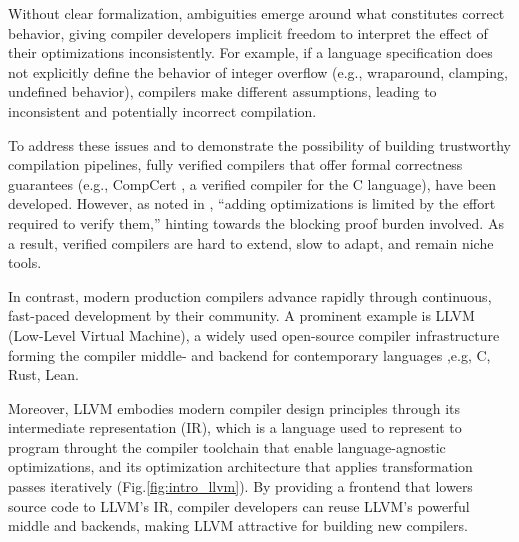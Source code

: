 \documentclass[review, anonymous, acmsmall, screen]{acmart}
\begin{document}
 Without clear formalization, ambiguities emerge around what 
 constitutes correct behavior, giving compiler developers implicit freedom to interpret the effect 
 of their optimizations inconsistently. For example, if a language specification does not explicitly 
 define the behavior of integer overflow (e.g., wraparound, clamping, undefined behavior), compilers
  make different assumptions, leading to inconsistent and potentially incorrect compilation.

To address these issues and to demonstrate the possibility of building trustworthy compilation pipelines,
 fully verified compilers that offer formal correctness guarantees (e.g., CompCert \cite{compcert_web}, 
 a verified compiler for the C language), have been developed. However, as noted in \cite{Mullen2016}, 
 “adding optimizations is limited by the effort required to verify them,” hinting towards the blocking 
 proof burden involved. As a result, verified compilers are hard to extend, slow to adapt, and remain 
 niche tools.

 In contrast, modern production compilers advance rapidly through continuous, fast-paced development 
 by their community. A prominent example is LLVM (Low-Level Virtual Machine)\cite{llvm_ref}, 
 a widely used open-source compiler infrastructure forming the compiler middle- and backend for 
 contemporary languages ,e.g, C, Rust, Lean.

Moreover, LLVM embodies modern compiler design principles through its intermediate representation 
(IR), which is a language used to represent to program throught the compiler toolchain that enable 
language-agnostic optimizations, and its optimization architecture that applies transformation passes 
iteratively (Fig.\ref{fig:intro_llvm}). By providing a frontend that lowers source code to LLVM's IR,
compiler developers can reuse LLVM's powerful middle and backends, making LLVM attractive for building
new compilers.
\end{document}
